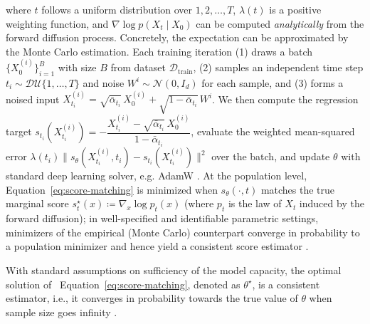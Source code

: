 \documentclass{article}
\def\Eqref#1{Equation~\ref{#1}}
\begin{document}
where $t$ follows a uniform distribution over $1,2,\dots,T$, $\lambda(t)$ is a positive weighting function, and $\nabla\log p(X_t \mid X_0)$ can be computed \emph{analytically} from the forward diffusion process. Concretely, the expectation can be approximated by the Monte Carlo estimation. Each training iteration (1) draws a batch $\{ X_0^{(i)}\}_{i=1}^B$ with size $B$ from dataset $\mathcal{D}_{\text{train}}$, (2) samples an independent time step $t_i \sim \mathcal{DU}\{1,\dots,T\}$ and noise $W^i \sim \mathcal{N}(0,I_d)$ for each sample, and (3) forms a noised input $X_{t_i}^{(i)} = \sqrt{\bar\alpha_{t_i}}\,X_0^{(i)} + \sqrt{1-\bar\alpha_{t_i}}\,W^{i}$. We then compute the regression target $s_{t_i}(X_{t_i}^{(i)}) = -\dfrac{X_{t_i}^{(i)}-\sqrt{\bar\alpha_{t_i}}\,X_0^{(i)}}{1-\bar\alpha_{t_i}}$, evaluate the weighted mean-squared error $\lambda(t_i)\| s_{\theta}(X^{(i)}_{t_i},t_i) - s_{t_i}(X_{t_i}^{(i)}) \|^2$ over the batch, and update $\theta$ with standard deep learning solver, e.g. AdamW \citep{loshchilov2017decoupled}. 
At the population level, \Eqref{eq:score-matching} is minimized when $s_\theta(\cdot,t)$ matches the true marginal score $s_t^\star(x)\coloneqq\nabla_x\log p_t(x)$ (where $p_t$ is the law of $X_t$ induced by the forward diffusion); in well-specified and identifiable parametric settings, minimizers of the empirical (Monte Carlo) counterpart converge in probability to a population minimizer and hence yield a consistent score estimator \citep{hyvarinen2005estimation,song2020score}.

With standard assumptions on sufficiency of the model capacity, the optimal solution of ~\Eqref{eq:score-matching}, denoted as $\theta^\star$, is a consistent estimator, i.e., it converges in probability towards
the true value of $\theta$ when sample size goes infinity \citep{song2020score, hyvarinen2005estimation}.
\end{document}
